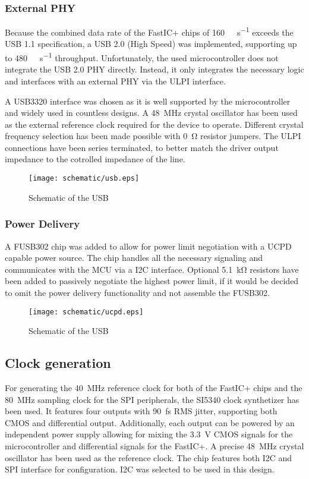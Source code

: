 \subsubsection{External PHY}
Because the combined data rate of the FastIC+ chips of \SI{160}{\mega\bit\per\second} exceeds the USB 1.1 specification, a USB 2.0 (High Speed) was implemented, supporting up to \SI{480}{\mega\bit\per\second} throughput. Unfortunately, the used microcontroller does not integrate the USB 2.0 PHY directly. Instead, it only integrates the necessary logic and interfaces with an external PHY via the ULPI interface. 


A USB3320 interface was chosen as it is well supported by the microcontroller and widely used in countless designs. A \SI{48}{\mega\hertz} crystal oscillator has been used as the external reference clock required for the device to operate. Different crystal frequency selection has been made possible with \SI{0}{\ohm} resistor jumpers. The ULPI connections have been series terminated, to better match the driver output impedance to the cotrolled impedance of the line. 
\FloatBarrier
\begin{figure}[htp!]
    \centering
    \texttt{[image: schematic/usb.eps]}
    \caption{Schematic of the USB}
    \label{fig:schem_usb}
\end{figure}
\FloatBarrier
\subsubsection{Power Delivery}
A FUSB302 chip was added to allow for power limit negotiation with a UCPD capable power source. The chip handles all the necessary signaling and communicates with the MCU via a I2C interface. Optional \SI{5.1}{\kilo\ohm} resistors have been added to passively negotiate the highest power limit, if it would be decided to omit the power delivery functionality and not assemble the FUSB302.
\FloatBarrier
\begin{figure}[htp!]
    \centering
    \texttt{[image: schematic/ucpd.eps]}
    \caption{Schematic of the USB}
    \label{fig:schem_ucpd}
\end{figure}
\FloatBarrier
\subsection{Clock generation}
For generating the \SI{40}{\mega\hertz} reference clock for both of the FastIC+ chips and the \SI{80}{\mega\hertz} sampling clock for the SPI peripherals, the SI5340 clock synthetizer has been used. It features four outputs with \SI{90}{\femto\second} RMS jitter, supporting both CMOS and differential output. Additionally, each output can be powered by an independent power supply allowing for mixing the \SI{3.3}{\volt} CMOS signals for the microcontroller and differential signals for the FastIC+. A precise \SI{48}{\mega\hertz} crystal oscillator has been used as the reference clock. The chip features both I2C and SPI interface for configuration. I2C was selected to be used in this design.

